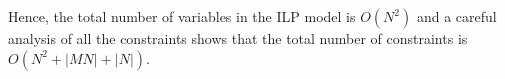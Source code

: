 \noindent
Hence, the total number of variables in the ILP model is $O(N^2)$ and a careful analysis of all the constraints shows that the total number of constraints is $O(N^2 + |MN| + |N|)$.



